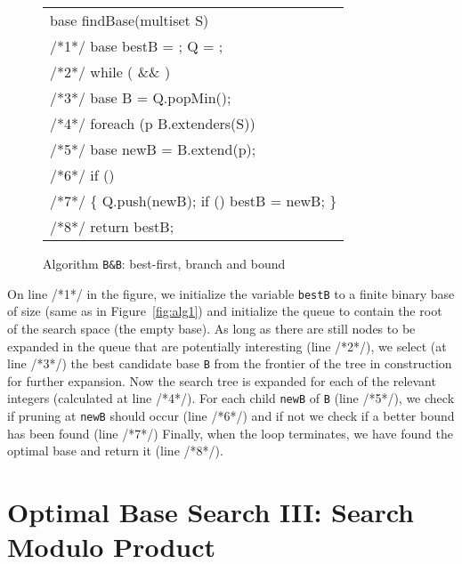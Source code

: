 \documentclass[envcountsame]{llncs}
\newenvironment{SProg}
     {\begin{small}\begin{tt}\begin{tabular}[c]{l}}{\end{tabular}\end{tt}\end{small}}
\newcommand{\qin}{\hspace*{0.15in}}
\begin{document}
\begin{figure}[t]
  \begin{SProg}
  base findBase(multiset S)\\
  {\scriptsize /*1*/} \qin base  bestB = ; 
                           \fbox{priority\_queue} Q = ;\\
  {\scriptsize /*2*/} \qin while ( \mbox{\&\&} 
        ) \\
  {\scriptsize /*3*/} \qin\qin  base B = Q.popMin();\\
  {\scriptsize /*4*/} \qin\qin  foreach (p  B.extenders(S)) \\
  {\scriptsize /*5*/} \qin\qin\qin base newB = B.extend(p);\\
  {\scriptsize /*6*/} \qin\qin\qin  if () \\
  {\scriptsize /*7*/} \qin\qin\qin\qin  \{ Q.push(newB); 			
        if () bestB =
        newB; \}\\ 
  {\scriptsize /*8*/} \qin return bestB;\\
\end{SProg}
\caption{Algorithm \texttt{B\&B}: best-first, branch and bound}
\label{fig:alg2}
\vspace{-3ex}
\end{figure}


On line {\scriptsize /*1*/} in the figure, we initialize the variable
\texttt{bestB} to a finite binary base of size
 (same as in Figure~\ref{fig:alg1})
and initialize the queue to contain the
root of the search space (the empty base).
As long as there are still nodes to be expanded in the queue that are
potentially interesting (line {\scriptsize /*2*/}), we select (at line
{\scriptsize /*3*/}) the best candidate base \texttt{B} from the
frontier of the tree in construction for further expansion.  Now the
search tree is expanded for each of the relevant integers (calculated
at line {\scriptsize /*4*/}). For each child \texttt{newB} of
\texttt{B} (line {\scriptsize /*5*/}), we check if pruning at
\texttt{newB} should occur (line {\scriptsize /*6*/}) and if not we
check if a better bound has been found (line {\scriptsize /*7*/})
Finally, when the loop terminates, we have found the optimal base and
return it (line {\scriptsize /*8*/}).










\section{Optimal Base Search III: Search Modulo Product}
\label{sec:ob3}
\end{document}
